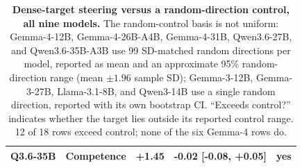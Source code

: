 \begin{table}[H]
\begin{tabular}{@{}llrlc@{}}
Q3.6-35B & Competence & +1.45 & -0.02 [-0.08, +0.05] & yes \\
\bottomrule
\end{tabular}
\caption{\textbf{Dense-target steering versus a random-direction control, all nine models.} The random-control basis is not uniform: Gemma-4-12B, Gemma-4-26B-A4B, Gemma-4-31B, Qwen3.6-27B, and Qwen3.6-35B-A3B use 99 SD-matched random directions per model, reported as mean and an approximate 95\% random-direction range (mean $\pm 1.96$ sample SD); Gemma-3-12B, Gemma-3-27B, Llama-3.1-8B, and Qwen3-14B use a single random direction, reported with its own bootstrap CI. ``Exceeds control?'' indicates whether the target lies outside its reported control range. 12 of 18 rows exceed control; none of the six Gemma-4 rows do.}
\label{tab:concept_signal_vs_control}
\end{table}
